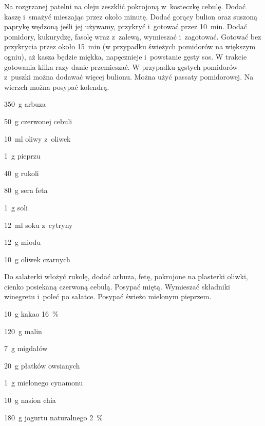 \documentclass[../main.tex]{subfiles}
\begin{document}
Na rozgrzanej patelni na oleju zeszklić pokrojoną w~kosteczkę cebulę. Dodać
kaszę i~smażyć mieszając przez około minutę. Dodać gorący bulion oraz suszoną
paprykę wędzoną jeśli jej używamy, przykryć i~gotować przez \qty{10}{\minute}.
Dodać pomidory, kukurydzę, fasolę wraz z~zalewą, wymieszać i~zagotować. Gotować
bez przykrycia przez około \qty{15}{\minute} (w przypadku świeżych pomidorów na
większym ogniu), aż kasza będzie miękka, napęcznieje i~powstanie gęsty sos. W
trakcie gotowania kilka razy danie przemieszać. W przypadku gęstych pomidorów
z~puszki można dodawać więcej bulionu. Można użyć passaty pomidorowej. Na
wierzch można posypać kolendrą.


\begin{Ingred}
    \item \qty{350}{\gram} arbuza
    \item \qty{50}{\gram} czerwonej cebuli
    \item \qty{10}{\milli\litre} oliwy z~oliwek
    \item \qty{1}{\gram} pieprzu
    \item \qty{40}{\gram} rukoli
    \item \qty{80}{\gram} sera feta
    \item \qty{1}{\gram} soli
    \item \qty{12}{\milli\litre} soku z~cytryny
    \item \qty{12}{\gram} miodu
    \item \qty{10}{\gram} oliwek czarnych
\end{Ingred}

Do salaterki włożyć rukolę, dodać arbuza, fetę, pokrojone na plasterki oliwki,
cienko posiekaną czerwoną cebulą. Posypać miętą. Wymieszać składniki winegretu
i~poleć po sałatce. Posypać świeżo mielonym pieprzem.


\begin{Ingred}
    \item \qty{10}{\gram} kakao \qty{16}{\percent}
    \item \qty{120}{\gram} malin
    \item \qty{7}{\gram} migdałów
    \item \qty{20}{\gram} płatków owsianych
    \item \qty{1}{\gram} mielonego cynamonu
    \item \qty{10}{\gram} nasion chia
    \item \qty{180}{\gram} jogurtu naturalnego \qty{2}{\percent}
\end{Ingred}
\end{document}

